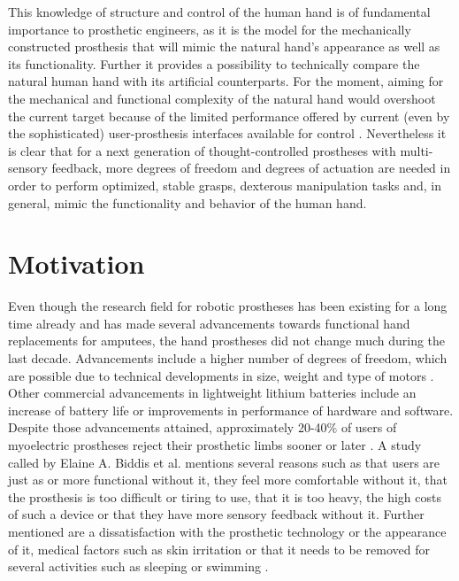 \documentclass[main]{subfiles}
\begin{document}
This knowledge of structure and control of the human hand is of fundamental importance to prosthetic engineers, as it is the model for the mechanically constructed prosthesis that will mimic the natural hand's appearance as well as its functionality. Further it provides a possibility to technically compare the natural human hand with its artificial counterparts. For the moment, aiming for the mechanical and functional complexity of the natural hand would overshoot the current target because of the limited performance offered by current (even by the sophisticated) user-prosthesis interfaces available for control \cite{Tenore2009,Rossini2010}. Nevertheless it is clear that for a next generation of thought-controlled prostheses with multi-sensory feedback, more degrees of freedom and degrees of actuation are needed in order to perform optimized, stable grasps, dexterous manipulation tasks and, in general, mimic the functionality and behavior of the human hand.

\section{Motivation}
Even though the research field for robotic prostheses has been existing for a long time already and has made several advancements towards functional hand replacements for amputees, the hand prostheses did not change much during the last decade. Advancements include a higher number of degrees of freedom, which are possible due to technical developments in size, weight and type of motors \cite{Kyberd2001,DelCura2003,Pons2002}. Other commercial advancements in lightweight lithium batteries \cite{Williams2005} include an increase of battery life or improvements in performance of hardware and software. Despite those advancements attained, approximately 20-40\% of users of myoelectric prostheses reject their prosthetic limbs sooner or later \cite{abandonment1}. A study called  by Elaine A. Biddis et al. mentions several reasons such as that users are just as or more functional without it, they feel more comfortable without it, that the prosthesis is too difficult or tiring to use, that it is too heavy, the high costs of such a device or that they have more sensory feedback without it. Further mentioned are a dissatisfaction with the prosthetic technology or the appearance of it, medical factors such as skin irritation or that it needs to be removed for several activities such as sleeping or swimming \cite{abandonment2}.
\end{document}
